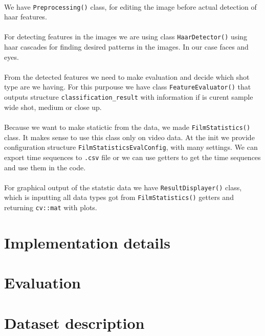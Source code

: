 \documentclass[english]{article}
\begin{document}
\paragraph{}
	We have \texttt{Preprocessing()} class, for editing the image before actual detection of haar features.
\paragraph{}
	For detecting features in the images we are using class \texttt{HaarDetector()} using haar cascades for finding desired 
	patterns in the images. In our case faces and eyes.
\paragraph{}
	From the detected features we need to make evaluation and decide which shot type are we having. For this purpouse we have
	class \texttt{FeatureEvaluator()} that outputs structure \texttt{classification\_result} with information if is curent sample
	wide shot, medium or close up.
\paragraph{}
	Because we want to make statictic from the data, we made \texttt{FilmStatistics()} class. It makes sense to use this class only on
	video data. At the init we provide configuration structure \texttt{FilmStatisticsEvalConfig}, with many settings. 
	We can export time sequences to \texttt{.csv} file or we can use getters to get the time sequences and use them in the code.
\paragraph{}
	For graphical output of the statstic data we have \texttt{ResultDisplayer()} class, which is inputting all data types got
	from \texttt{FilmStatistics()} getters and returning \texttt{cv::mat} with plots.




\section{Implementation details}

\section{Evaluation}

\section{Dataset description}
\end{document}
